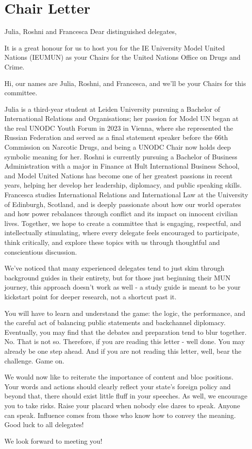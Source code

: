 \section{Chair Letter}

\begin{chairletter}{Julia, Roshni and Francesca}
Dear distinguished delegates,

It is a great honour for us to host you for the IE University Model United Nations (IEUMUN) as your Chairs for the United Nations Office on Drugs and Crime.

Hi, our names are Julia, Roshni, and Francesca, and we’ll be your Chairs for this committee.

Julia is a third-year student at Leiden University pursuing a Bachelor of International Relations and Organisations; her passion for Model UN began at the real UNODC Youth Forum in 2023 in Vienna, where she represented the Russian Federation and served as a final statement speaker before the 66th Commission on Narcotic Drugs, and being a UNODC Chair now holds deep symbolic meaning for her. Roshni is currently pursuing a Bachelor of Business Administration with a major in Finance at Hult International Business School, and Model United Nations has become one of her greatest passions in recent years, helping her develop her leadership, diplomacy, and public speaking skills. Francesca studies International Relations and International Law at the University of Edinburgh, Scotland, and is deeply passionate about how our world operates and how power rebalances through conflict and its impact on innocent civilian lives. Together, we hope to create a committee that is engaging, respectful, and intellectually stimulating, where every delegate feels encouraged to participate, think critically, and explore these topics with us through thoughtful and conscientious discussion.

We’ve noticed that many experienced delegates tend to just skim through background guides in their entirety, but for those just beginning their MUN journey, this approach doesn’t work as well - a study guide is meant to be your kickstart point for deeper research, not a shortcut past it.

You will have to learn and understand the game: the logic, the performance, and the careful act of balancing public statements and backchannel diplomacy. Eventually, you may find that the debates and preparation tend to blur together. No. That is not so. Therefore, if you are reading this letter - well done. You may already be one step ahead. And if you are not reading this letter, well, bear the challenge. Game on.

We would now like to reiterate the importance of content and bloc positions. Your words and actions should clearly reflect your state’s foreign policy and beyond that, there should exist little fluff in your speeches. As well, we encourage you to take risks. Raise your placard when nobody else dares to speak. Anyone can speak. Influence comes from those who know how to convey the meaning. Good luck to all delegates!

We look forward to meeting you!

\end{chairletter}
